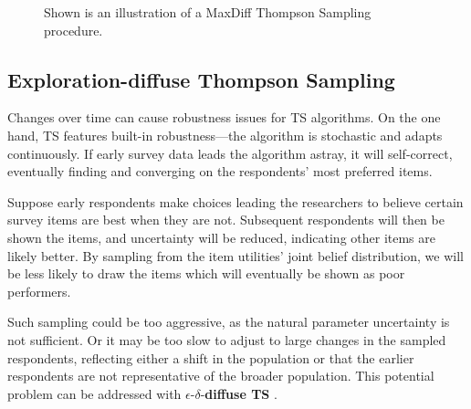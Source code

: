 \documentclass[a4paper,11pt]{article}
\newcommand{\edts}{$\epsilon$-$\delta$-\textbf{diffuse TS} }
\begin{document}
\begin{figure}
\caption{Shown is an illustration of a MaxDiff Thompson Sampling procedure.}
\label{fig:illustrate_ts}
	\begin{center}
    \qquad
    \end{center}
\end{figure}

\subsection{Exploration-diffuse Thompson Sampling}

Changes over time can cause robustness issues for TS algorithms. On the one hand, TS features built-in robustness---the algorithm is stochastic and adapts continuously. If early survey data leads the algorithm astray, it will self-correct, eventually finding and converging on the respondents' most preferred items. 

Suppose  early respondents make choices leading the researchers to believe certain survey items are best when they are not. Subsequent respondents will then be shown the items, and uncertainty will be reduced, indicating other items are likely better. By sampling from the item utilities' joint belief distribution, we will be less likely to draw the items which will eventually be shown as poor performers. 

Such sampling could be too aggressive, as the natural parameter uncertainty is not sufficient. Or it may be too slow to adjust to large changes in the sampled respondents, reflecting either a shift in the population or that the earlier respondents are not representative of the broader population. This potential problem can be addressed with \edts.
\end{document}
